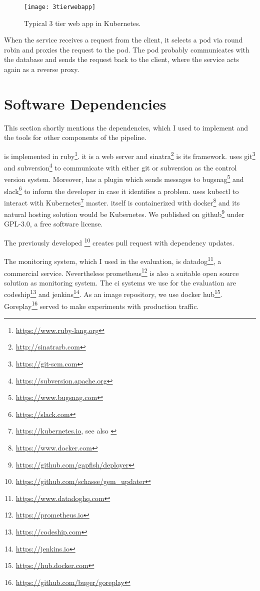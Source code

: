 \begin{figure}[htbp]
  \centering
  \texttt{[image: 3tierwebapp]}
  \caption[3tierwebapp]{Typical 3 tier web app in Kubernetes.}
  \label{fig:3tierwebapp}
\end{figure}

When the service receives a request from the client, it selects a pod via round robin and
proxies the request to the pod. The pod probably communicates with the database and sends
the request back to the client, where the service acts again as a reverse proxy.

\section{Software Dependencies}

This section shortly mentions the dependencies, which I used to implement \deployer and the
tools for other components of the pipeline.

\deployer is implemented in ruby\footnote{\url{https://www.ruby-lang.org}}. it is a
web server and sinatra\footnote{\url{http://sinatrarb.com}} is its framework. \deployer uses
git\footnote{\url{https://git-scm.com}} and
subversion\footnote{\url{https://subversion.apache.org}} to communicate with either git or
subversion as the control version system. Moreover, \deployer has a plugin which sends
messages to bugsnag\footnote{\url{https://www.bugsnag.com}} and
slack\footnote{\url{https://slack.com}} to inform the developer in case it identifies a
problem. \deployer uses kubectl to interact with
Kubernetes\footnote{\url{https://kubernetes.io}, see also
  \cite{kubernetes_architecture,kubernetes_architecture2}} master. \deployer itself is
containerized with docker\footnote{\url{https://www.docker.com}} and its natural hosting
solution would be Kubernetes. We published \deployer on
github\footnote{\url{https://github.com/gapfish/deployer}} under GPL-3.0, a free software
license.

The previously developed \gemupdater\footnote{\url{https://github.com/schasse/gem_updater}}
creates pull request with dependency updates.

The monitoring system, which I used in the evaluation, is
datadog\footnote{\url{https://www.datadoghq.com}}, a commercial service. Nevertheless
prometheus\footnote{\url{https://prometheus.io}} is also a suitable open source solution
as monitoring system. The \gls{ci} systems we use for the evaluation are
codeship\footnote{\url{https://codeship.com}} and
jenkins\footnote{\url{https://jenkins.io}}. As an image repository, we use docker
hub\footnote{\url{https://hub.docker.com}}. Goreplay\footnote{\url{https://github.com/buger/goreplay}}
served to make experiments with production traffic.

